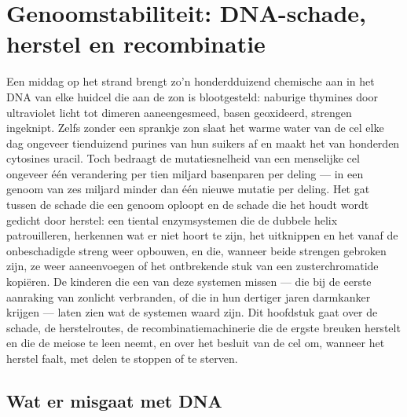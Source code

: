 \chapter{Genoomstabiliteit: DNA-schade, herstel en recombinatie}\label{ch:b3:dna-repair}

Een middag op het strand brengt zo'n honderdduizend chemische 
aan in het DNA van elke huidcel die aan de zon is blootgesteld:
naburige thymines door ultraviolet licht tot dimeren aaneengesmeed,
basen geoxideerd, strengen ingeknipt. Zelfs zonder een sprankje zon
slaat het warme water van de cel elke dag ongeveer tienduizend purines
van hun suikers af en maakt het van honderden cytosines uracil. Toch
bedraagt de mutatiesnelheid van een menselijke cel ongeveer één
verandering per tien miljard basenparen per deling --- in een genoom
van zes miljard minder dan één nieuwe mutatie per deling. Het gat
tussen de schade die een genoom oploopt en de schade die het houdt
wordt gedicht door herstel: een tiental enzymsystemen die de dubbele
helix patrouilleren, herkennen wat er niet hoort te zijn, het
uitknippen en het vanaf de onbeschadigde streng weer opbouwen, en die,
wanneer beide strengen gebroken zijn, ze weer aaneenvoegen of het
ontbrekende stuk van een zusterchromatide kopiëren. De kinderen die
een van deze systemen missen --- die bij de eerste aanraking van
zonlicht verbranden, of die in hun dertiger jaren darmkanker krijgen
--- laten zien wat de systemen waard zijn. Dit hoofdstuk gaat over de
schade, de herstelroutes, de recombinatiemachinerie die de ergste
breuken herstelt en die de meiose te leen neemt, en over het besluit
van de cel om, wanneer het herstel faalt, met delen te stoppen of te
sterven.

\section{Wat er misgaat met DNA}

